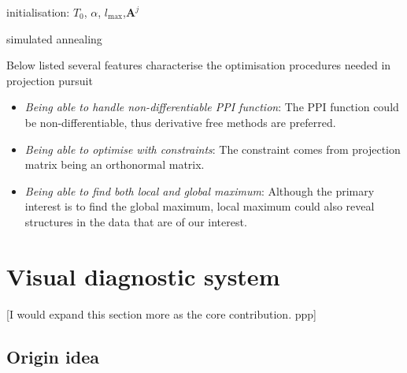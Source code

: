 \documentclass[12pt]{article}
\begin{document}
\newpage
\begin{algorithm}[H]
\SetAlgoLined
  initialisation: $T_0$, $\alpha$, $l_{\max}$,$\mathbf{A}^j$\;
  \caption{simulated annealing}
  \label{simulated_annealing}
\end{algorithm}

\newpage

Below listed several features characterise the optimisation procedures
needed in projection pursuit

\begin{itemize}
\item
  \emph{Being able to handle non-differentiable PPI function}: The PPI
  function could be non-differentiable, thus derivative free methods are
  preferred.
\item
  \emph{Being able to optimise with constraints}: The constraint comes
  from projection matrix being an orthonormal matrix.
\item
  \emph{Being able to find both local and global maximum}: Although the
  primary interest is to find the global maximum, local maximum could
  also reveal structures in the data that are of our interest.
\end{itemize}

\hypertarget{vis-diag}{%
\section{Visual diagnostic system}\label{vis-diag}}

{[}I would expand this section more as the core contribution. ppp{]}

\hypertarget{origin-idea}{%
\subsection{Origin idea}\label{origin-idea}}
\end{document}
